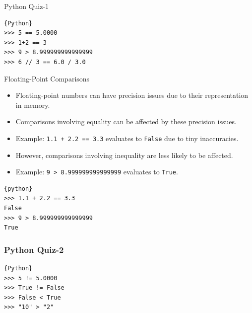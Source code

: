 \documentclass{beamer}
\begin{document}
\begin{frame}[fragile]{Python Quiz-1}
\begin{lstlisting}{Python}
>>> 5 == 5.0000
>>> 1+2 == 3 
>>> 9 > 8.999999999999999
>>> 6 // 3 == 6.0 / 3.0
\end{lstlisting}
\end{frame}

\begin{frame}[fragile]{Floating-Point Comparisons}
    \begin{itemize}
        \item Floating-point numbers can have precision issues due to their representation in memory.
        \item Comparisons involving equality can be affected by these precision issues.
        \item Example: \texttt{1.1 + 2.2 == 3.3} evaluates to \texttt{False} due to tiny inaccuracies.
        \item However, comparisons involving inequality are less likely to be affected.
        \item Example: \texttt{9 > 8.999999999999999} evaluates to \texttt{True}.
    \end{itemize}
    \begin{lstlisting}{python}
>>> 1.1 + 2.2 == 3.3
False
>>> 9 > 8.999999999999999
True
    \end{lstlisting}
\end{frame}

\begin{frame}[fragile]
    \frametitle{Python Quiz-2}
    \begin{lstlisting}{Python}
>>> 5 != 5.0000
>>> True != False
>>> False < True
>>> "10" > "2"
    \end{lstlisting}
\end{frame}
\end{document}
